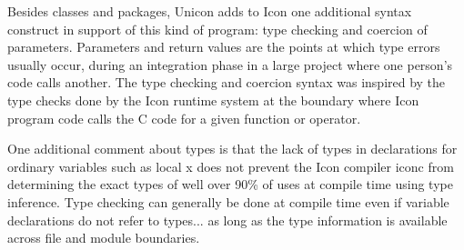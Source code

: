 Besides classes and packages, Unicon adds to Icon one additional
syntax construct in support of this kind of program: type checking and
coercion of parameters. Parameters and return values are the points at
which type errors usually occur, during an integration phase in a
large project where one person's code calls another. The type checking
and coercion syntax was inspired by the type checks done by the Icon
runtime system at the boundary where Icon program code calls the C
code for a given function or operator.


One additional comment about types is that the lack of types in
declarations for ordinary variables such as {\textquotedbl}local
x{\textquotedbl} does not prevent the Icon compiler iconc from
determining the exact types of well over 90\% of uses at compile time
using type inference. Type checking can generally be done at compile
time even if variable declarations do not refer to types... as long as
the type information is available across file and module boundaries.
